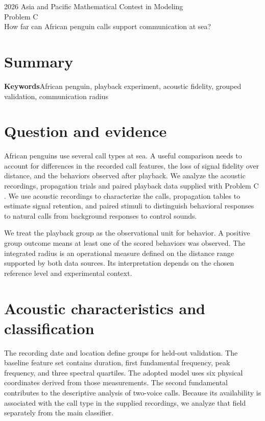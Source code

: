 \documentclass[11pt,a4paper]{article}
\begin{document}
\begin{center}
{\small 2026 Asia and Pacific Mathematical Contest in Modeling}\\[1em]
{\large Problem C \quad \TeamNumber}\\[2em]
{\LARGE How far can African penguin calls support communication at sea?}
\end{center}
\vspace{1em}
\section*{Summary}
\PaperSummary

\textbf{Keywords}\quad African penguin, playback experiment, acoustic fidelity, grouped validation, communication radius

\clearpage
\tableofcontents
\clearpage

\section{Question and evidence}
African penguins use several call types at sea. A useful comparison needs to account for differences in the recorded call features, the loss of signal fidelity over distance, and the behaviors observed after playback. We analyze the acoustic recordings, propagation trials and paired playback data supplied with Problem C \cite{problem,archive}. We use acoustic recordings to characterize the calls, propagation tables to estimate signal retention, and paired stimuli to distinguish behavioral responses to natural calls from background responses to control sounds.

We treat the playback group as the observational unit for behavior. A positive group outcome means at least one of the scored behaviors was observed. The integrated radius is an operational measure defined on the distance range supported by both data sources. Its interpretation depends on the chosen reference level and experimental context.

\section{Acoustic characteristics and classification}
The recording date and location define groups for held-out validation. The baseline feature set contains duration, first fundamental frequency, peak frequency, and three spectral quartiles. The adopted model uses six physical coordinates derived from those measurements. The second fundamental contributes to the descriptive analysis of two-voice calls. Because its availability is associated with the call type in the supplied recordings, we analyze that field separately from the main classifier.
\end{document}
